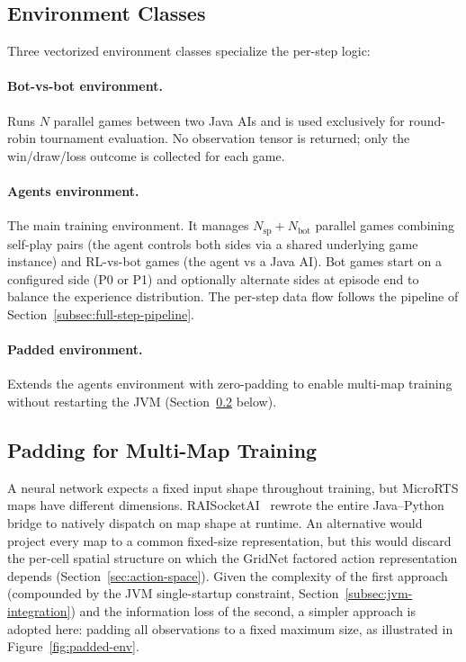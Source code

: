 \subsection{Environment Classes}
\label{subsec:env-classes}

Three vectorized environment classes specialize the per-step logic:

\paragraph*{Bot-vs-bot environment.} Runs $N$ parallel games between two Java AIs and is used exclusively for round-robin tournament evaluation. No observation tensor is returned; only the win/draw/loss outcome is collected for each game.

\paragraph*{Agents environment.} The main training environment. It manages $N_\text{sp} + N_\text{bot}$ parallel games combining self-play pairs (the agent controls both sides via a shared underlying game instance) and RL-vs-bot games (the agent vs a Java AI). Bot games start on a configured side (P0 or P1) and optionally alternate sides at episode end to balance the experience distribution. The per-step data flow follows the pipeline of Section~\ref{subsec:full-step-pipeline}.

\paragraph*{Padded environment.} Extends the agents environment with zero-padding to enable multi-map training without restarting the JVM (Section~\ref{subsec:padding} below).

\subsection{Padding for Multi-Map Training}
\label{subsec:padding}

A neural network expects a fixed input shape throughout training, but MicroRTS maps have different dimensions. RAISocketAI~\cite{goodfriendCompetitionWinningDeep2024} rewrote the entire Java--Python bridge to natively dispatch on map shape at runtime. An alternative would project every map to a common fixed-size representation, but this would discard the per-cell spatial structure on which the GridNet factored action representation depends (Section~\ref{sec:action-space}). Given the complexity of the first approach (compounded by the JVM single-startup constraint, Section~\ref{subsec:jvm-integration}) and the information loss of the second, a simpler approach is adopted here: padding all observations to a fixed maximum size, as illustrated in Figure~\ref{fig:padded-env}.

